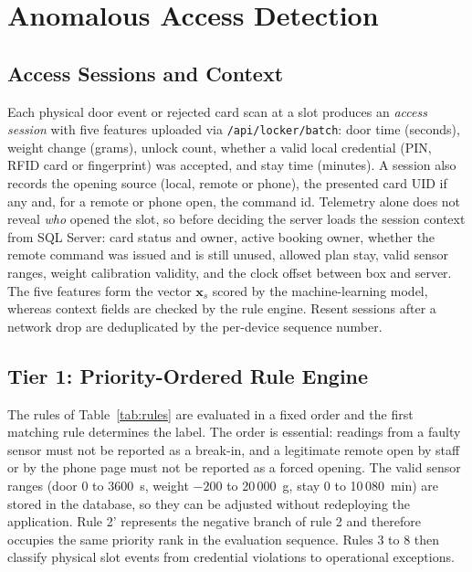\documentclass[journal,onecolumn]{IEEEtran}
\begin{document}
\section{Anomalous Access Detection}

\subsection{Access Sessions and Context}

Each physical door event or rejected card scan at a slot produces an \emph{access session} with five features uploaded
via \texttt{/api/locker/batch}: door time (seconds), weight change (grams), unlock count, whether a valid local
credential (PIN, RFID card or fingerprint) was accepted, and stay time (minutes). A session also records the opening
source (local, remote or phone), the presented card UID if any and, for a remote or phone open, the command id.
Telemetry alone does not reveal \emph{who} opened the slot, so before deciding the server loads the session context
from SQL Server: card status and owner, active booking owner, whether the remote command was issued and is still
unused, allowed plan stay, valid sensor ranges, weight calibration validity, and the clock offset between box and
server. The five features form the vector $\mathbf{x}_s$ scored by the machine-learning model, whereas context fields
are checked by the rule engine. Resent sessions after a network drop are deduplicated by the per-device sequence number.

\subsection{Tier 1: Priority-Ordered Rule Engine}

The rules of Table~\ref{tab:rules} are evaluated in a fixed order and the first matching rule determines the label.
The order is essential: readings from a faulty sensor must not be reported as a break-in, and a legitimate remote open
by staff or by the phone page must not be reported as a forced opening. The valid sensor ranges (door 0 to 3600~s,
weight $-200$ to 20\,000~g, stay 0 to 10\,080~min) are stored in the database, so they can be adjusted without
redeploying the application. Rule 2' represents the negative branch of rule 2 and therefore occupies the same priority
rank in the evaluation sequence. Rules 3 to 8 then classify physical slot events from credential violations to
operational exceptions.
\end{document}
